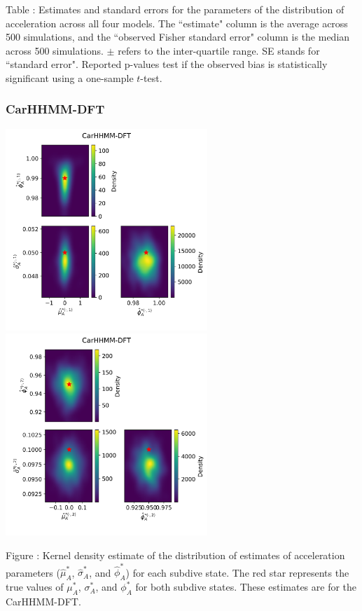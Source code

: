 \documentclass{article}
\begin{document}
        \noindent Table : Estimates and standard errors for the parameters of the distribution of acceleration across all four models. The ``estimate" column is the average across 500 simulations, and the ``observed Fisher standard error" column is the median across 500 simulations. $\pm$ refers to the inter-quartile range. SE stands for ``standard error". Reported p-values test if the observed bias is statistically significant using a one-sample $t$-test.
        \addtocounter{tablenum}{1}
    
        \subsubsection{CarHHMM-DFT}
        \begin{center}
        \includegraphics[width=3in]{../Plots/hhmm_FV_MLE_density_A_0_0.png}
        \includegraphics[width=3in]{../Plots/hhmm_FV_MLE_density_A_0_1.png}
        \end{center}
        
        \noindent Figure : Kernel density estimate of the distribution of estimates of acceleration parameters ($\hat \mu^*_A$, $\hat \sigma^*_A$, and $\hat \phi^*_A$) for each subdive state. The red star represents the true values of $\mu^*_A$, $\sigma^*_A$, and $\phi^*_A$ for both subdive states. These estimates are for the CarHHMM-DFT.
        \addtocounter{fignum}{1}
        
\end{document}
